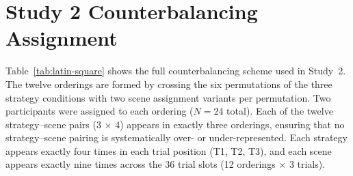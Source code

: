 \documentclass[manuscript,review,anonymous]{acmart}
\begin{document}

\section{Study 2 Counterbalancing Assignment}
\label{app:latin-square}

Table~\ref{tab:latin-square} shows the full counterbalancing scheme used in Study~2. The twelve orderings are formed by crossing the six permutations of the three strategy conditions with two scene assignment variants per permutation. Two participants were assigned to each ordering ($N = 24$ total). Each of the twelve strategy--scene pairs (3 $\times$ 4) appears in exactly three orderings, ensuring that no strategy--scene pairing is systematically over- or under-represented. Each strategy appears exactly four times in each trial position (T1, T2, T3), and each scene appears exactly nine times across the 36 trial slots (12 orderings $\times$ 3 trials).
\end{document}
